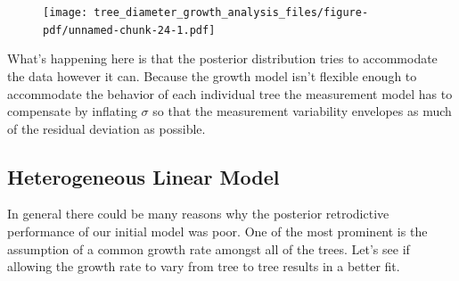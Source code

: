 \documentclass[
  letterpaper,
  DIV=11,
  numbers=noendperiod]{scrartcl}
\newenvironment{Shaded}{\begin{snugshade}}{\end{snugshade}}
\newcommand{\AttributeTok}[1]{\textcolor[rgb]{0.40,0.45,0.13}{#1}}
\newcommand{\DecValTok}[1]{\textcolor[rgb]{0.68,0.00,0.00}{#1}}
\newcommand{\FloatTok}[1]{\textcolor[rgb]{0.68,0.00,0.00}{#1}}
\newcommand{\FunctionTok}[1]{\textcolor[rgb]{0.28,0.35,0.67}{#1}}
\newcommand{\NormalTok}[1]{\textcolor[rgb]{0.00,0.23,0.31}{#1}}
\newcommand{\OtherTok}[1]{\textcolor[rgb]{0.00,0.23,0.31}{#1}}
\newcommand{\SpecialCharTok}[1]{\textcolor[rgb]{0.37,0.37,0.37}{#1}}
\newcommand{\StringTok}[1]{\textcolor[rgb]{0.13,0.47,0.30}{#1}}
\begin{document}
\begin{Shaded}
\end{Shaded}

\begin{figure}[H]

{\centering \texttt{[image: tree\_diameter\_growth\_analysis\_files/figure-pdf/unnamed-chunk-24-1.pdf]}

}

\end{figure}

What's happening here is that the posterior distribution tries to
accommodate the data however it can. Because the growth model isn't
flexible enough to accommodate the behavior of each individual tree the
measurement model has to compensate by inflating \(\sigma\) so that the
measurement variability envelopes as much of the residual deviation as
possible.

\hypertarget{sec:hetero-linear}{%
\subsection{Heterogeneous Linear Model}\label{sec:hetero-linear}}

In general there could be many reasons why the posterior retrodictive
performance of our initial model was poor. One of the most prominent is
the assumption of a common growth rate amongst all of the trees. Let's
see if allowing the growth rate to vary from tree to tree results in a
better fit.
\end{document}
